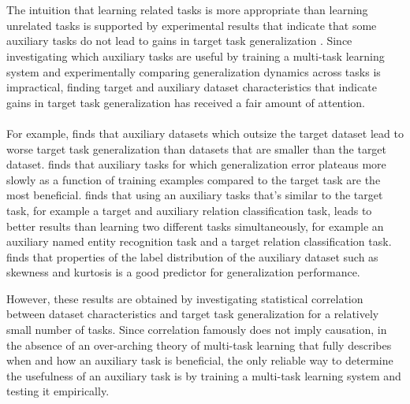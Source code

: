 \\\\
The intuition that learning related tasks is more appropriate than learning unrelated tasks is supported by experimental results that indicate that some auxiliary tasks do not lead to gains in target task generalization \citep{bingel2017, luong2015, mou2016, alonso2016, benton2017}. Since investigating which auxiliary tasks are useful by training a multi-task learning system and experimentally comparing generalization dynamics across tasks is impractical, finding target and auxiliary dataset characteristics that indicate gains in target task generalization has received a fair amount of attention.
\\\\
For example, \citet{luong2015} finds that auxiliary datasets which outsize the target dataset lead to worse target task generalization than datasets that are smaller than the target dataset. \citet{bingel2017} finds that auxiliary tasks for which generalization error plateaus more slowly as a function of training examples compared to the target task are the most beneficial. \citet{mou2016} finds that using an auxiliary tasks that's similar to the target task, for example a target and auxiliary relation classification task, leads to better results than learning two different tasks simultaneously, for example an auxiliary named entity recognition task and a target relation classification task. \citet{alonso2016} finds that properties of the label distribution of the auxiliary dataset such as skewness and kurtosis is a good predictor for generalization performance.

However, these results are obtained by investigating statistical correlation between dataset characteristics and target task generalization for a relatively small number of tasks. Since correlation famously does not imply causation, in the absence of an over-arching theory of multi-task learning that fully describes when and how an auxiliary task is beneficial, the only reliable way to determine the usefulness of an auxiliary task is by training a multi-task learning system and testing it empirically.